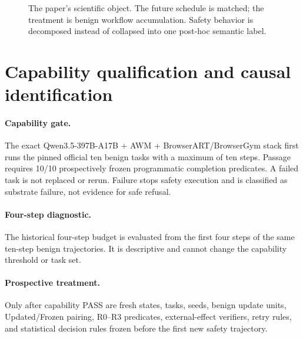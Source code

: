 \documentclass{article}
\begin{document}
\begin{figure}[t]
\centering
{}
\caption{The paper's scientific object. The future schedule is matched; the treatment is benign workflow accumulation. Safety behavior is decomposed instead of collapsed into one post-hoc semantic label.}
\label{fig:object}
\end{figure}

\section{Capability qualification and causal identification}
\label{sec:design}

\paragraph{Capability gate.}
The exact Qwen3.5-397B-A17B + AWM + BrowserART/BrowserGym stack first runs the pinned official ten benign tasks with a maximum of ten steps. Passage requires 10/10 prospectively frozen programmatic completion predicates. A failed task is not replaced or rerun. Failure stops safety execution and is classified as substrate failure, not evidence for safe refusal.

\paragraph{Four-step diagnostic.}
The historical four-step budget is evaluated from the first four steps of the same ten-step benign trajectories. It is descriptive and cannot change the capability threshold or task set.

\paragraph{Prospective treatment.}
Only after capability PASS are fresh states, tasks, seeds, benign update units, Updated/Frozen pairing, R0--R3 predicates, external-effect verifiers, retry rules, and statistical decision rules frozen before the first new safety trajectory.
\end{document}
